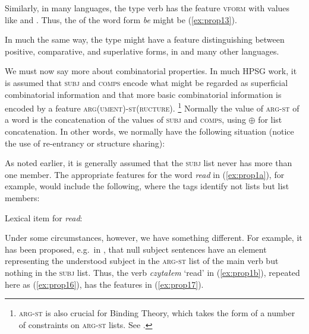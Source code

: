 \documentclass[output=paper
	        ,collection
	        ,collectionchapter
 	        ,biblatex
                ,babelshorthands
                ,newtxmath
                ,draftmode
                ,colorlinks, citecolor=brown
]{langscibook}
\begin{document}
\ea\label{ex:prop12}
\z

\noindent
Similarly, in many languages, the type verb has the feature \textsc{vform} with values like  and . Thus, the  of the word form \emph{be} might be (\ref{ex:prop13}).

\ea\label{ex:prop13}
\z

\noindent
In much the same way, the type  might have a feature distinguishing between positive, comparative, and superlative forms, in  and many other languages.

We must now say more about combinatorial properties. In much HPSG work, it is assumed that \textsc{subj} and \textsc{comps} encode what might be regarded as superficial combinatorial information and that more basic combinatorial information is encoded by a feature \textsc{arg(ument)-st(ructure)}.%
%
\footnote{\textsc{arg-st} is also crucial for Binding Theory, which takes the form of a number of constraints on \textsc{arg-st} lists. See .}
%
Normally the value of \textsc{arg-st} of a word is the concatenation of the values of \textsc{subj} and \textsc{comps}, using $\oplus$ for list concatenation. In other words, we normally have the following situation (notice the use of re-entrancy or structure sharing):

\ea\label{ex:prop14}
\z

\noindent
As noted earlier, it is generally assumed that the \textsc{subj} list never has more than one member. The appropriate features for the word \emph{read} in (\ref{ex:prop1a}), for example, would include the following, where the tags identify not lists but list members:

\eas
\label{ex:prop15}
Lexical item for \emph{read}:\\
\zs

\noindent
Under some circumstances, however, we have something different. For example, it has been proposed, e.g.\ in \citet[65]{MS99a}, that null subject sentences have an element representing the understood subject in the \textsc{arg-st} list of the main verb but nothing in the \textsc{subj} list. Thus, the verb \emph{czytałem} `read' in (\ref{ex:prop1b}), repeated here as (\ref{ex:prop16}), has the features in (\ref{ex:prop17}).
\end{document}
